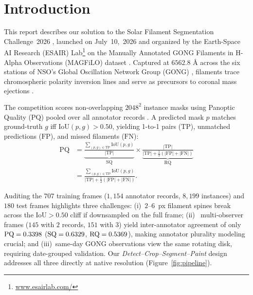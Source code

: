 \documentclass[sigconf]{acmart}
\begin{document}
\begin{abstract}
\href{https://github.com/yauwes/filament-segmentation-2026-sota}{github.com/yauwes/filament-segmentation-2026-sota}.
\end{abstract}

\maketitle

\section{Introduction}
This report describes our solution to the Solar Filament Segmentation Challenge~2026 \cite{filament-segmentation-2026}, launched on July~10,~2026 and organized by the Earth-Space AI Research (ESAIR) Lab\footnote{\href{https://www.esairlab.com/home}{www.esairlab.com/}} on the Manually Annotated GONG Filaments in H-Alpha Observations (MAGFiLO) dataset \cite{ahmadzadeh2024dataset}. Captured at $6562.8\text{ \AA}$ across the six stations of NSO's Global Oscillation Network Group (GONG) \cite{harVEY1996gong}, filaments trace chromospheric polarity inversion lines and serve as precursors to coronal mass ejections \cite{parenti2014solar}.

The competition scores non-overlapping $2048^2$ instance masks using Panoptic Quality ($\mathrm{PQ}$) pooled over all annotator records \cite{kirillov2019panoptic}. A predicted mask $p$ matches ground-truth $g$ iff $\mathrm{IoU}(p,g) > 0.50$, yielding 1-to-1 pairs ($\mathrm{TP}$), unmatched predictions ($\mathrm{FP}$), and missed filaments ($\mathrm{FN}$):
\begin{equation}\label{eq:pq}
\begin{aligned}
  \mathrm{PQ} &= \underbrace{\frac{\sum_{(p,g) \in \mathrm{TP}} \mathrm{IoU}(p,g)}{|\mathrm{TP}|}}_{\mathrm{SQ}} \times \underbrace{\frac{|\mathrm{TP}|}{|\mathrm{TP}| + \frac{1}{2}(|\mathrm{FP}| + |\mathrm{FN}|)}}_{\mathrm{RQ}} \\
  &= \frac{\sum_{(p,g)\in\mathrm{TP}}\mathrm{IoU}(p,g)}{|\mathrm{TP}| + \frac{1}{2}(|\mathrm{FP}| + |\mathrm{FN}|)}.
\end{aligned}
\end{equation}

Auditing the $707$ training frames ($1{,}154$ annotator records, $8{,}199$ instances) and $180$ test frames highlights three challenges: (i)~$2\text{--}6$~px filament spines break across the $\mathrm{IoU}>0.50$ cliff if downsampled on the full frame; (ii)~\multiphotos{} multi-observer frames ($145$ with $2$ records, $151$ with $3$) yield inter-annotator agreement of only $\mathrm{PQ}=0.3398$ ($\mathrm{SQ}=0.6329$, $\mathrm{RQ}=0.5369$), making annotator plurality modeling crucial; and (iii)~same-day GONG observations view the same rotating disk, requiring date-grouped validation. Our \emph{Detect--Crop--Segment--Paint} design addresses all three directly at native resolution (Figure~\ref{fig:pipeline}).
\end{document}
